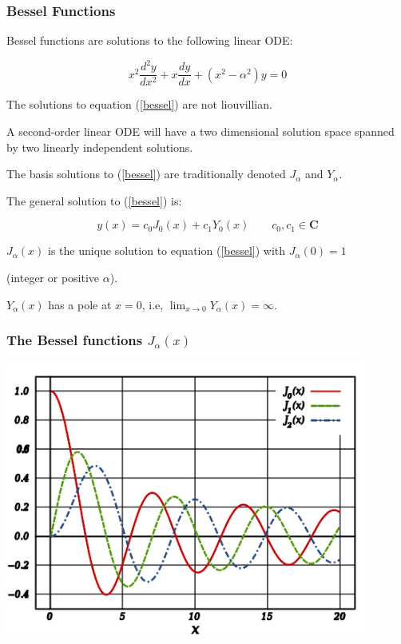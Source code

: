 \documentclass{beamer}
\begin{document}
\begin{frame}
\frametitle{Bessel Functions}
Bessel functions are solutions to the following linear ODE:

\begin{equation}
\label{bessel}
x^2 \frac{d^2 y}{dx^2} + x \frac{dy}{dx} + (x^2 - \alpha^2) y = 0
\end{equation}

The solutions to equation (\ref{bessel}) are not liouvillian.

\vskip 12pt

A second-order linear ODE will have a two dimensional solution space spanned by two linearly independent solutions.

\vskip 12pt

The basis solutions to (\ref{bessel}) are traditionally denoted $J_\alpha$ and $Y_\alpha$.

\vskip 12pt

The general solution to (\ref{bessel}) is:

\[ y(x) = c_0 J_0(x) + c_1 Y_0(x) \qquad c_0,c_1 \in \mathbf{C}\]

$J_\alpha(x)$ is the unique solution to equation (\ref{bessel}) with $J_\alpha(0)=1$

\qquad (integer or positive $\alpha$).

$Y_\alpha(x)$ has a pole at $x=0$, i.e, $\lim_{x\to 0} Y_\alpha(x) = \infty$.
\end{frame}

\begin{frame}
\frametitle{The Bessel functions $J_\alpha(x)$}
\includegraphics[width=0.9\textwidth]{Bessel_Functions_(1st_Kind,_n=0,1,2).png}
\end{frame}
\end{document}

